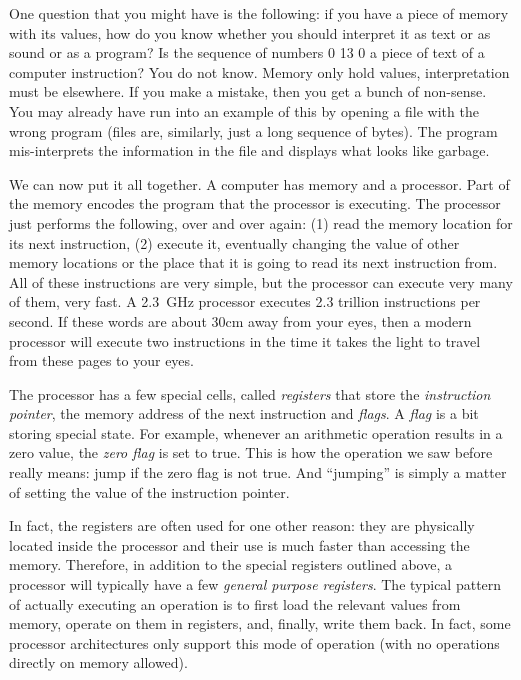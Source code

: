One question that you might have is the following: if you have a piece of
memory with its values, how do you know whether you should interpret it as text
or as sound or as a program? Is the sequence of numbers 0 13 0 a piece of text
of a computer instruction? You do not know. Memory only hold values,
interpretation must be elsewhere. If you make a mistake, then you get a bunch
of non-sense. You may already have run into an example of this by opening a
file with the wrong program (files are, similarly, just a long sequence of
bytes). The program mis-interprets the information in the file and displays
what looks like garbage.

\medskip

We can now put it all together. A computer has memory and a processor. Part of
the memory encodes the program that the processor is executing. The processor
just performs the following, over and over again: (1) read the memory location
for its next instruction, (2) execute it, eventually changing the value of
other memory locations or the place that it is going to read its next
instruction from. All of these instructions are very simple, but the processor
can execute very many of them, very fast. A 2.3~GHz processor executes 2.3
trillion instructions per second. If these words are about 30cm away from your
eyes, then a modern processor will execute two instructions in the time it
takes the light to travel from these pages to your eyes. %

The processor has a few special cells, called \emph{registers} that store the
\emph{instruction pointer}, the memory address of the next instruction and
\emph{flags}. A \emph{flag} is a bit storing special state. For example,
whenever an arithmetic operation results in a zero value, the \emph{zero flag}
is set to true. This is how the  operation we saw before
really means: jump if the zero flag is not true. And ``jumping'' is simply a
matter of setting the value of the instruction pointer.

In fact, the registers are often used for one other reason: they are physically
located inside the processor and their use is much faster than accessing the
memory. Therefore, in addition to the special registers outlined above, a
processor will typically have a few \emph{general purpose registers}. The
typical pattern of actually executing an operation is to first load the
relevant values from memory, operate on them in registers, and, finally, write
them back. In fact, some processor architectures only support this mode of
operation (with no operations directly on memory allowed).


